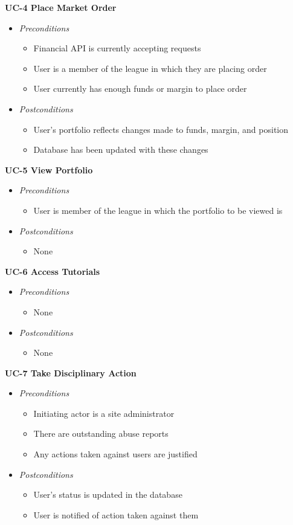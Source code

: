 \textbf{UC-4 Place Market Order}
\begin{itemize}
	\item \emph{Preconditions}
		\begin{itemize}
		\item Financial API is currently accepting requests
		\item User is a member of the league in which they are placing order
		\item User currently has enough funds or margin to place order
		\end{itemize}
	\item \emph{Postconditions}
		\begin{itemize}
		\item User's portfolio reflects changes made to funds, margin, and position
		\item Database has been updated with these changes
		\end{itemize}
\end{itemize}
\textbf{UC-5 View Portfolio}
\begin{itemize}
	\item \emph{Preconditions}
		\begin{itemize}
		\item User is member of the league in which the portfolio to be viewed is
		\end{itemize}
	\item \emph{Postconditions}
		\begin{itemize}
		\item None
		\end{itemize}
\end{itemize}
\textbf{UC-6 Access Tutorials}
\begin{itemize}
	\item \emph{Preconditions}
		\begin{itemize}
		\item None
		\end{itemize}
	\item \emph{Postconditions}
		\begin{itemize}
		\item None
		\end{itemize}
\end{itemize}
\textbf{UC-7 Take Disciplinary Action}
\begin{itemize}
	\item \emph{Preconditions}
		\begin{itemize}
		\item Initiating actor is a site administrator
		\item There are outstanding abuse reports
		\item Any actions taken against users are justified
		\end{itemize}
	\item \emph{Postconditions}
		\begin{itemize}
		\item User's status is updated in the database
		\item User is notified of action taken against them
		\end{itemize}
\end{itemize}